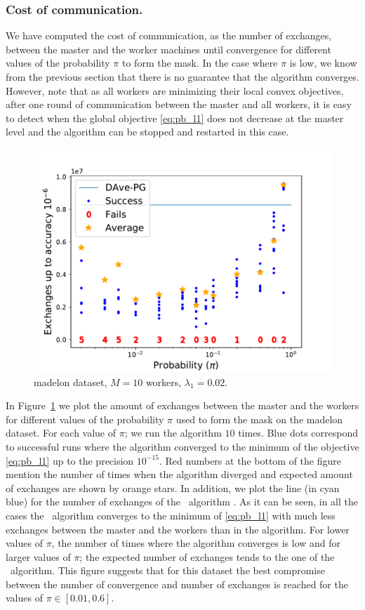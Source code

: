 \subsubsection{Cost of communication.}
We have computed the cost of communication, as the number of exchanges, between the master and the worker machines until convergence for different values of the probability $\pi$ to form the mask. In the case where $\pi$ is low, we know from the previous section that there is no guarantee that the algorithm \SP{} converges. However, note that as all workers are minimizing their local convex objectives, after one round of communication between the master and all workers, it is easy to detect when the global objective \eqref{eq:pb_l1} does not decrease at the master level and the algorithm can be stopped and restarted in this case. 
\begin{figure}[b!]
    \includegraphics[width = \linewidth]{SODA/Figs/madelon_10w_002_0001_robust.pdf}
    \caption{madelon dataset, $M=10$ workers, $\lambda_1 = 0.02$.}
    \label{fig:madelon_robust}
\end{figure} 
In Figure~\ref{fig:madelon_robust} we plot the amount of exchanges between the master and the workers for different values of the probability $\pi$ used to form the mask on the madelon dataset. For each value of $\pi$; we run the algorithm $10$ times. Blue dots correspond to successful runs where the algorithm converged to the minimum of the objective \eqref{eq:pb_l1} up to the precision $10^{-15}$. Red numbers at the bottom of the figure mention the number of times when the algorithm diverged and expected amount of exchanges are shown by orange stars. In addition, we plot the line (in cyan blue) for the number of exchanges of the \dave~algorithm \cite{ICML18}. As it can be seen, in  all the cases the \SP{}~algorithm converges to the minimum of \eqref{eq:pb_l1} with much less exchanges between the master and the workers than in the \dave{} algorithm. For lower values of $\pi$, the number of times where the algorithm converges is low and for larger values of $\pi$; the expected number of exchanges tends to the one of the \dave~algorithm. This figure suggests that for this dataset the best compromise between the number of convergence and number of exchanges is reached for the values of $\pi\in[0.01,0.6]$. 
